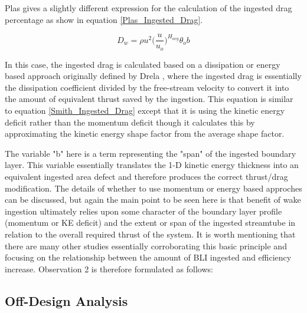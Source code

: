 \documentclass[12pt]{gatech-thesis}
\begin{document}
Plas \cite{Plas2007} gives a slightly different expression for the calculation of the ingested drag percentage as show in equation \ref{Plas_Ingested_Drag}.

\begin{equation}D_w =  \rho u^2 \Big(\frac{u}{u_o}\Big)^{H_{avg}}\theta_o b\label{Plas_Ingested_Drag}\end{equation}%

In this case, the ingested drag is calculated based on a dissipation or energy based approach originally defined by Drela \cite{Drela2009}, where the ingested drag is essentially the dissipation coefficient divided by the free-stream velocity to convert it into the amount of equivalent thrust saved by the ingestion.  This equation is similar to equation \ref{Smith_Ingested_Drag} except that it is using the kinetic energy deficit rather than the momentum deficit though it calculates this by approximating the kinetic energy shape factor from the average shape factor.  

The variable "b" here is a term representing the "span" of the ingested boundary layer.  This variable essentially translates the 1-D kinetic energy thickness into an equivalent ingested area defect and therefore produces the correct thrust/drag modification.  The details of whether to use momentum or energy based approches can be discussed, but again the main point to be seen here is that benefit of wake ingestion ultimately relies upon some character of the boundary layer profile (momentum or KE deficit) and the extent or span of the ingested streamtube in relation to the overall required thrust of the system.  It is worth mentioning that there are many other studies essentially corroborating this basic principle and focusing on the relationship between the amount of BLI ingested and efficiency increase.  Observation 2 is therefore formulated as follows:

\vspace{1pt}
\vspace{5mm}
\vspace{5mm}

\subsection{Off-Design Analysis}
\end{document}

